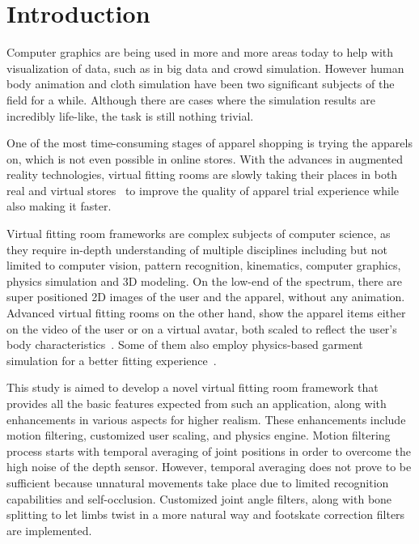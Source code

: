 \chapter{Introduction}
\label{chapter_introduction}

Computer graphics are being used in more and more areas today to help with visualization of data, such as in big data and crowd simulation. However human body animation and cloth simulation have been two significant subjects of the field for a while. Although there are cases where the simulation results are incredibly life-like, the task is still nothing trivial. 

One of the most time-consuming stages of apparel shopping is trying the apparels on, which is not even possible in online stores. With the advances in augmented reality technologies, virtual fitting rooms are slowly taking their places in both real and virtual stores~\cite{Fitnect2012,Styku2013} to improve the quality of apparel trial experience while also making it faster.

Virtual fitting room frameworks are complex subjects of computer science, as they require in-depth understanding of multiple disciplines 
including but not limited to computer vision, pattern recognition, kinematics, computer graphics, physics simulation and 3D modeling. 
On the low-end of the spectrum, there are super positioned 2D images of the user and the apparel, without any animation. Advanced virtual fitting rooms on the other hand, show the apparel items either on the video of the user or on a virtual avatar, both scaled to reflect the user's body characteristics~\cite{FaceCake2013}. Some of them also employ physics-based garment simulation for a better fitting experience~\cite{Styku2013}.

This study is aimed to develop a novel virtual fitting room framework that provides all the basic features expected from such an application, along with enhancements in various aspects for higher realism. These enhancements include motion filtering, customized user scaling, and physics engine. Motion filtering process starts with temporal averaging of joint positions in order to overcome the high noise of the depth sensor. However, temporal averaging does not prove to be sufficient because unnatural movements take place due to limited recognition capabilities and self-occlusion. Customized joint angle filters, along with bone splitting to let limbs twist in a more natural way and footskate correction filters are implemented.

